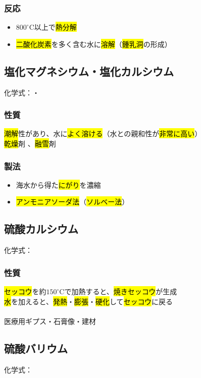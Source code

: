 \subsubsection{反応}
\begin{itemize}
  \item $800^{\circ}$C以上で\hl{熱分解}\\
  \item \hl{二酸化炭素}を多く含む水に\hl{溶解}（\hl{鍾乳洞}の形成）\\
\end{itemize}
\subsection{塩化マグネシウム・塩化カルシウム}
化学式：\hl{}・\hl{}
\subsubsection{性質}
\hl{潮解}性があり、水に\hl{よく溶ける}（水との親和性が\hl{非常に高い}）\\
\hl{乾燥}剤 、\hl{融雪}剤
\subsubsection{製法}
\begin{itemize}
  \item 海水から得た\hl{にがり}を濃縮  \K
  \item \hl{アンモニアソーダ法}（\hl{ソルベー法}） \K
\end{itemize}
\newpage
\subsection{硫酸カルシウム}
化学式：\hl{}
\subsubsection{性質}
\hl{セッコウ}を約$150^{\circ}$Cで加熱すると、\hl{焼きセッコウ}が生成\\
\hl{水}を加えると、\hl{発熱}・\hl{膨張}・\hl{硬化}して\hl{セッコウ}に戻る\\
\\
 医療用ギプス・石膏像・建材
\subsection{硫酸バリウム}
化学式：\hl{}
